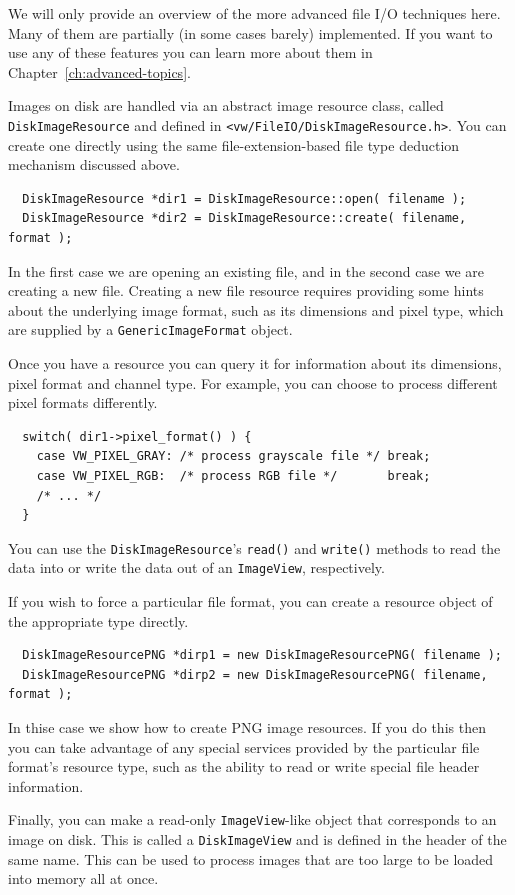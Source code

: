 We will only provide an overview of the more advanced file I/O 
techniques here.  Many of them are partially (in some cases barely) 
implemented.  If you want to use any of these features you can 
learn more about them in Chapter~\ref{ch:advanced-topics}.

Images on disk are handled via an abstract image resource
class, called \verb#DiskImageResource# and defined in
\verb#<vw/FileIO/DiskImageResource.h>#.  You can create one directly 
using the same file-extension-based file type deduction mechanism 
discussed above.
\begin{verbatim}
  DiskImageResource *dir1 = DiskImageResource::open( filename );
  DiskImageResource *dir2 = DiskImageResource::create( filename, format );
\end{verbatim}
In the first case we are opening an existing file, and in the second 
case we are creating a new file.  Creating a new file resource requires 
providing some hints about the underlying image format, such as its 
dimensions and pixel type, which are supplied by a \verb#GenericImageFormat# 
object.

Once you have a resource you can query it for information about its 
dimensions, pixel format and channel type.  For example, you can choose 
to process different pixel formats differently.
\begin{verbatim}
  switch( dir1->pixel_format() ) {
    case VW_PIXEL_GRAY: /* process grayscale file */ break;
    case VW_PIXEL_RGB:  /* process RGB file */       break;
    /* ... */
  }
\end{verbatim}
You can use the \verb#DiskImageResource#'s \verb#read()# and \verb#write()# 
methods to read the data into or write the data out of an \verb#ImageView#, 
respectively.

If you wish to force a particular file format, you can create a resource 
object of the appropriate type directly.
\begin{verbatim}
  DiskImageResourcePNG *dirp1 = new DiskImageResourcePNG( filename );
  DiskImageResourcePNG *dirp2 = new DiskImageResourcePNG( filename, format );
\end{verbatim}
In thise case we show how to create PNG image resources.  If you do this 
then you can take advantage of any special services provided by the 
particular file format's resource type, such as the ability to read or 
write special file header information.

Finally, you can make a read-only \verb#ImageView#-like object that 
corresponds to an image on disk.  This is called a \verb#DiskImageView# 
and is defined in the header of the same name.  This can be used to 
process images that are too large to be loaded into memory all at once. 


